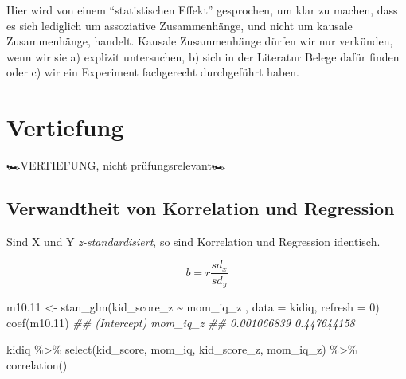 \documentclass[
  a4paper,
  DIV=11]{scrreprt}
\newenvironment{Shaded}{\begin{snugshade}}{\end{snugshade}}
\newcommand{\AttributeTok}[1]{\textcolor[rgb]{0.40,0.45,0.13}{#1}}
\newcommand{\DecValTok}[1]{\textcolor[rgb]{0.68,0.00,0.00}{#1}}
\newcommand{\DocumentationTok}[1]{\textcolor[rgb]{0.37,0.37,0.37}{\textit{#1}}}
\newcommand{\FloatTok}[1]{\textcolor[rgb]{0.68,0.00,0.00}{#1}}
\newcommand{\FunctionTok}[1]{\textcolor[rgb]{0.28,0.35,0.67}{#1}}
\newcommand{\NormalTok}[1]{\textcolor[rgb]{0.00,0.23,0.31}{#1}}
\newcommand{\OtherTok}[1]{\textcolor[rgb]{0.00,0.23,0.31}{#1}}
\newcommand{\SpecialCharTok}[1]{\textcolor[rgb]{0.37,0.37,0.37}{#1}}
\theoremstyle{definition}
\theoremstyle{remark}
\begin{document}
\begin{tcolorbox}[enhanced jigsaw, leftrule=.75mm, left=2mm, bottomrule=.15mm, opacityback=0, coltitle=black, colbacktitle=quarto-callout-important-color!10!white, opacitybacktitle=0.6, rightrule=.15mm, toptitle=1mm, colback=white, colframe=quarto-callout-important-color-frame, arc=.35mm, toprule=.15mm, breakable, titlerule=0mm, bottomtitle=1mm, title=\textcolor{quarto-callout-important-color}{\faExclamation}\hspace{0.5em}{Wichtig}]
Hier wird von einem ``statistischen Effekt'' gesprochen, um klar zu
machen, dass es sich lediglich um assoziative Zusammenhänge, und nicht
um kausale Zusammenhänge, handelt. Kausale Zusammenhänge dürfen wir nur
verkünden, wenn wir sie a) explizit untersuchen, b) sich in der
Literatur Belege dafür finden oder c) wir ein Experiment fachgerecht
durchgeführt haben.
\end{tcolorbox}

\hypertarget{vertiefung-2}{%
\section{Vertiefung}\label{vertiefung-2}}

🏎️VERTIEFUNG, nicht prüfungsrelevant🏎️

\hypertarget{verwandtheit-von-korrelation-und-regression}{%
\subsection{Verwandtheit von Korrelation und
Regression}\label{verwandtheit-von-korrelation-und-regression}}

Sind X und Y \emph{z-standardisiert}, so sind Korrelation und Regression
identisch.

\[b = r \frac{sd_x}{sd_y}\]

\begin{Shaded}
\begin{Highlighting}[]
\NormalTok{m10}\FloatTok{.11} \OtherTok{\textless{}{-}} 
  \FunctionTok{stan\_glm}\NormalTok{(kid\_score\_z }\SpecialCharTok{\textasciitilde{}}\NormalTok{ mom\_iq\_z , }\AttributeTok{data =}\NormalTok{ kidiq, }\AttributeTok{refresh =} \DecValTok{0}\NormalTok{)}
\FunctionTok{coef}\NormalTok{(m10}\FloatTok{.11}\NormalTok{)}
\DocumentationTok{\#\# (Intercept)    mom\_iq\_z }
\DocumentationTok{\#\# 0.001066839 0.447644158}
\end{Highlighting}
\end{Shaded}

\begin{Shaded}
\begin{Highlighting}[]
\NormalTok{kidiq }\SpecialCharTok{\%\textgreater{}\%} 
  \FunctionTok{select}\NormalTok{(kid\_score, mom\_iq, kid\_score\_z, mom\_iq\_z) }\SpecialCharTok{\%\textgreater{}\%} 
  \FunctionTok{correlation}\NormalTok{()}
\end{Highlighting}
\end{Shaded}
\end{document}
